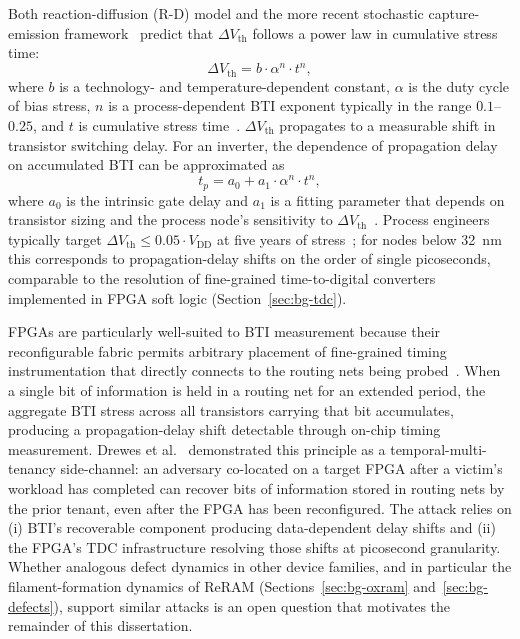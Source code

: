 Both reaction-diffusion (R-D) model and the more recent stochastic
capture-emission framework~\cite{bti_modelling_2013,
	mahapatra2016fundamentals} predict that $\Delta V_\text{th}$ follows a
power law in cumulative stress time:
\begin{equation}
	\label{eqn:bti-powerlaw}
	\Delta V_\text{th} = b \cdot \alpha^n \cdot t^n,
\end{equation}
where $b$ is a technology- and temperature-dependent constant,
$\alpha$ is the duty cycle of bias stress, $n$ is a
process-dependent BTI exponent typically in the range
$0.1$--$0.25$, and $t$ is cumulative stress time~\cite{wang2007bti,
	nunes2013ffbti, bti_modelling_2013}. $\Delta V_\text{th}$ propagates to a measurable shift in transistor
switching delay. For an inverter, the dependence of propagation
delay on accumulated BTI can be approximated as
\begin{equation}
	\label{eqn:bti-tp}
	t_p = a_0 + a_1 \cdot \alpha^n \cdot t^n,
\end{equation}
where $a_0$ is the intrinsic gate delay and $a_1$ is a fitting
parameter that depends on transistor sizing and the process node's
sensitivity to $\Delta V_\text{th}$~\cite{wang2007bti,
	nunes2013ffbti}. Process engineers typically target
$\Delta V_\text{th} \leq 0.05 \cdot V_\text{DD}$ at five years of
stress~\cite{taek2013bti, rzepa2018comphy}; for nodes below 32~nm
this corresponds to propagation-delay shifts on the order of single
picoseconds, comparable to the resolution of fine-grained
time-to-digital converters implemented in FPGA soft logic
(Section~\ref{sec:bg-tdc}).

FPGAs are particularly well-suited to BTI measurement because their
reconfigurable fabric permits arbitrary placement of fine-grained timing
instrumentation that directly connects to the routing nets being
probed~\cite{stott2010degradation, amouri2014aging,
	drewes2024pentimento}. When a single bit of information is held in a
routing net for an extended period, the aggregate BTI stress across all
transistors carrying that bit accumulates, producing a propagation-delay
shift detectable through on-chip timing measurement. Drewes et
al.~\cite{drewes2024pentimento} demonstrated this principle as a
temporal-multi-tenancy side-channel: an adversary co-located on a target
FPGA after a victim's workload has completed can recover bits of
information stored in routing nets by the prior tenant, even after the
FPGA has been reconfigured. The attack relies on (i) BTI's recoverable
component producing data-dependent delay shifts and (ii) the FPGA's TDC
infrastructure resolving those shifts at picosecond granularity. Whether
analogous defect dynamics in other device families, and in particular
the filament-formation dynamics of ReRAM (Sections~\ref{sec:bg-oxram}
and~\ref{sec:bg-defects}), support similar attacks is an open question
that motivates the remainder of this dissertation.